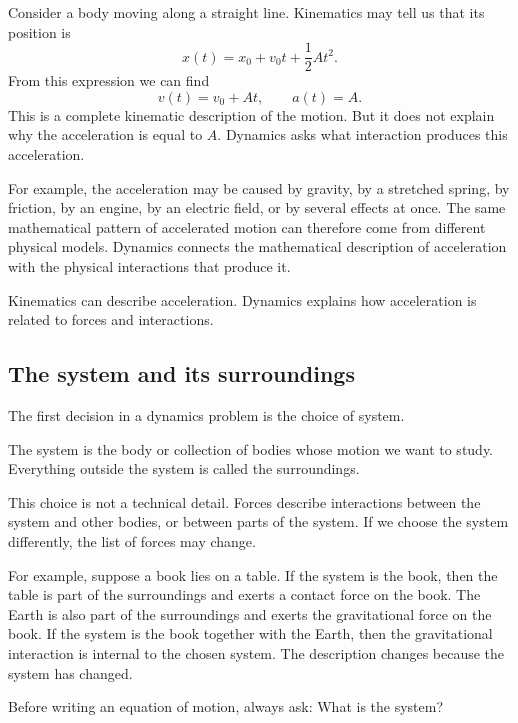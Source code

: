 Consider a body moving along a straight line. Kinematics may tell us that its position is
\[
x(t)=x_0+v_0t+\frac{1}{2}At^2.
\]
From this expression we can find
\[
v(t)=v_0+At,
\qquad
 a(t)=A.
\]
This is a complete kinematic description of the motion. But it does not explain why the acceleration is equal to \(A\). Dynamics asks what interaction produces this acceleration.

For example, the acceleration may be caused by gravity, by a stretched spring, by friction, by an engine, by an electric field, or by several effects at once. The same mathematical pattern of accelerated motion can therefore come from different physical models. Dynamics connects the mathematical description of acceleration with the physical interactions that produce it.

\begin{remarkbox}
Kinematics can describe acceleration. Dynamics explains how acceleration is related to forces and interactions.
\end{remarkbox}

\subsection{The system and its surroundings}

The first decision in a dynamics problem is the choice of system.

\begin{definitionbox}
The system is the body or collection of bodies whose motion we want to study. Everything outside the system is called the surroundings.
\end{definitionbox}

This choice is not a technical detail. Forces describe interactions between the system and other bodies, or between parts of the system. If we choose the system differently, the list of forces may change.

For example, suppose a book lies on a table. If the system is the book, then the table is part of the surroundings and exerts a contact force on the book. The Earth is also part of the surroundings and exerts the gravitational force on the book. If the system is the book together with the Earth, then the gravitational interaction is internal to the chosen system. The description changes because the system has changed.

\begin{remarkbox}
Before writing an equation of motion, always ask: What is the system?
\end{remarkbox}

